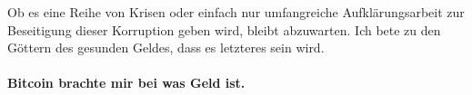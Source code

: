 Ob es eine Reihe von Krisen oder einfach nur umfangreiche Aufklärungsarbeit zur
Beseitigung dieser Korruption geben wird, bleibt abzuwarten. Ich bete zu den
Göttern des gesunden Geldes, dass es letzteres sein wird.

\paragraph{Bitcoin brachte mir bei was Geld ist.}

%
%
%
%
